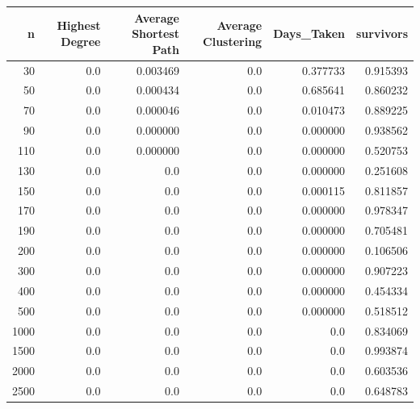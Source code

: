 \documentclass{article}
\begin{document}
            \begin{tabular}{rrrrrr}
                \toprule
                  n &  Highest Degree &  Average Shortest Path &  Average Clustering &  Days\_Taken &  survivors \\
                \midrule
                 30 &             0.0 &               0.003469 &                 0.0 &    0.377733 &   0.915393 \\
                 50 &             0.0 &               0.000434 &                 0.0 &    0.685641 &   0.860232 \\
                 70 &             0.0 &               0.000046 &                 0.0 &    0.010473 &   0.889225 \\
                 90 &             0.0 &               0.000000 &                 0.0 &    0.000000 &   0.938562 \\
                110 &             0.0 &               0.000000 &                 0.0 &    0.000000 &   0.520753 \\
                130 &             0.0 &                    0.0 &                 0.0 &    0.000000 &   0.251608 \\
                150 &             0.0 &                    0.0 &                 0.0 &    0.000115 &   0.811857 \\
                170 &             0.0 &                    0.0 &                 0.0 &    0.000000 &   0.978347 \\
                190 &             0.0 &                    0.0 &                 0.0 &    0.000000 &   0.705481 \\
                200 &             0.0 &                    0.0 &                 0.0 &    0.000000 &   0.106506 \\
                300 &             0.0 &                    0.0 &                 0.0 &    0.000000 &   0.907223 \\
                400 &             0.0 &                    0.0 &                 0.0 &    0.000000 &   0.454334 \\
                500 &             0.0 &                    0.0 &                 0.0 &    0.000000 &   0.518512 \\
                1000 &             0.0 &                    0.0 &                 0.0 &         0.0 &   0.834069 \\
                1500 &             0.0 &                    0.0 &                 0.0 &         0.0 &   0.993874 \\
                2000 &             0.0 &                    0.0 &                 0.0 &         0.0 &   0.603536 \\
                2500 &             0.0 &                    0.0 &                 0.0 &         0.0 &   0.648783 \\
                \bottomrule
            \end{tabular}
                
\end{document}

